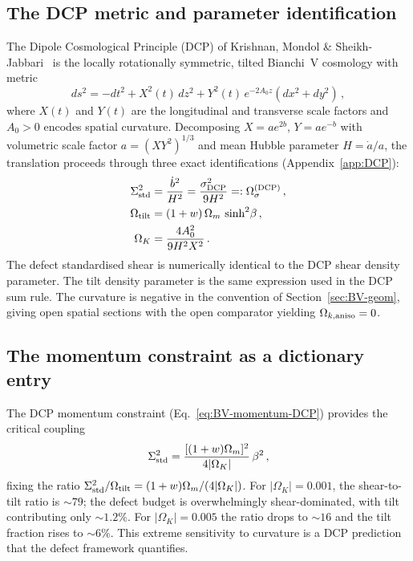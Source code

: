 \subsection{The DCP metric and parameter identification}

The Dipole Cosmological Principle (DCP) of Krishnan, Mondol \&
Sheikh-Jabbari~\cite{Krishnan2022,Krishnan2023} is the locally
rotationally symmetric, tilted Bianchi~V cosmology with metric
\begin{equation}\label{eq:DCP-metric}
ds^2 = -dt^2 + X^2(t)\,dz^2
     + Y^2(t)\,e^{-2A_0 z}(dx^2 + dy^2)\,,
\end{equation}
where $X(t)$ and $Y(t)$ are the longitudinal and transverse
scale factors and $A_0 > 0$ encodes spatial curvature.
Decomposing $X = ae^{2b}$, $Y = ae^{-b}$ with volumetric
scale factor $a = (XY^2)^{1/3}$ and mean Hubble parameter
$H = \dot{a}/a$, the translation proceeds through three exact
identifications (Appendix~\ref{app:DCP}):
\begin{align}
\Sigma^2_{\mathrm{std}} &= \frac{\dot{b}^2}{H^2}
= \frac{\sigma_{\mathrm{DCP}}^2}{9H^2}
=: \Omega_\sigma^{(\mathrm{DCP})}\,,
\label{eq:Sig-DCP}\\
\Omega_{\mathrm{tilt}} &= (1+w)\,\Omega_m\,\sinh^2\!\beta\,,
\label{eq:Otilt-DCP}\\
\Omega_K &= \frac{4A_0^2}{9H^2 X^2}\,.
\label{eq:OmK-DCP}
\end{align}
The defect standardised shear is numerically identical to the DCP
shear density parameter.  The tilt density parameter is the same
expression used in the DCP sum rule.  The curvature is negative
in the convention of Section~\ref{sec:BV-geom}, giving open
spatial sections with the open comparator yielding
$\Omega_{k,\mathrm{aniso}} = 0$.


\subsection{The momentum constraint as a dictionary entry}

The DCP momentum constraint
(Eq.~\eqref{eq:BV-momentum-DCP}) provides the critical coupling
\begin{equation}\label{eq:mom-dict}
\Sigma^2_{\mathrm{std}} = \frac{[(1+w)\Omega_m]^2}{4|\Omega_K|}\,\beta^2\,,
\end{equation}
fixing the ratio
$\Sigma^2_{\mathrm{std}}/\Omega_{\mathrm{tilt}} = (1+w)\Omega_m/(4|\Omega_K|)$.  For
$|\Omega_K| = 0.001$, the shear-to-tilt ratio is $\sim 79$;
the defect budget is overwhelmingly shear-dominated, with tilt
contributing only $\sim 1.2\%$.  For $|\Omega_K| = 0.005$ the
ratio drops to $\sim 16$ and the tilt fraction rises to
$\sim 6\%$.  This extreme sensitivity to curvature is a DCP
prediction that the defect framework quantifies.


